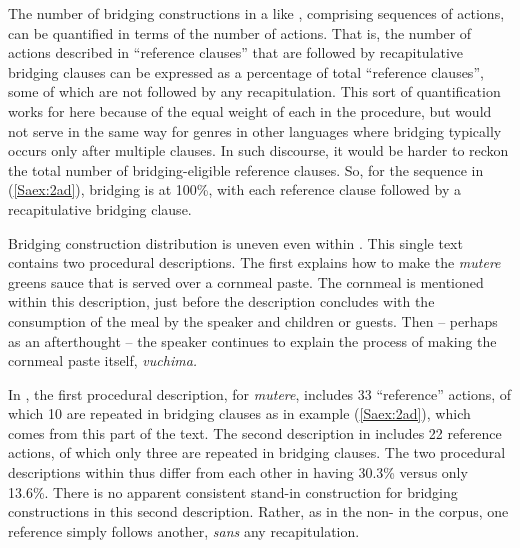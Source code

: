 \documentclass[output=paper]{LSP/langsci}
\begin{document}
The number of bridging constructions in a  like \citet{Chesi2014}, comprising sequences of actions, can be quantified in terms of the number of actions. That is, the number of actions described in ``reference clauses'' that are followed by recapitulative bridging clauses can be expressed as a percentage of total ``reference clauses'', some of which are not followed by any recapitulation. This sort of quantification works for  here because of the equal weight of each  in the procedure, but would not serve in the same way for genres in other languages where bridging typically occurs only after multiple clauses. In such discourse, it would be harder to reckon the total number of bridging-eligible reference clauses. So, for the sequence in (\ref{Saex:2ad}), bridging is at 100\%, with each reference clause followed by a recapitulative bridging clause.

Bridging construction distribution is uneven even within \citet{Chesi2014}. This single text contains two procedural descriptions. The first explains how to make the \textit{mutere} greens sauce that is served over a cornmeal paste. The cornmeal is mentioned within this description, just before the description concludes with the consumption of the meal by the speaker and children or guests. Then -- perhaps as an afterthought -- the speaker continues to explain the process of making the cornmeal paste itself, \textit{vuchima.} 

In \citet{Chesi2014}, the first procedural description, for \textit{mutere}, includes 33 ``reference'' actions, of which 10 are repeated in bridging clauses as in example (\ref{Saex:2ad}), which comes from this part of the text. The second description in \citet{Chesi2014} includes 22 reference actions, of which only three are repeated in bridging clauses. The two procedural descriptions within \citet{Chesi2014} thus differ from each other in having 30.3\%  versus only 13.6\%. There is no apparent consistent stand-in construction for bridging constructions in this second description. Rather, as in the non- in the corpus, one reference  simply follows another, \textit{sans} any recapitulation.
\end{document}
